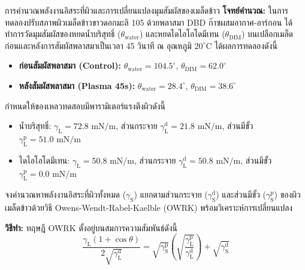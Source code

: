 \begin{examplebox}{การคำนวณพลังงานอิสระที่ผิวและการเปลี่ยนแปลงมุมสัมผัสของเมล็ดข้าว}
\textbf{โจทย์คำนวณ:} ในการทดลองปรับสภาพผิวเมล็ดข้าวขาวดอกมะลิ 105 ด้วยพลาสมา DBD ก๊าซผสมอากาศ-อาร์กอน ได้ทำการวัดมุมสัมผัสของหยดน้ำบริสุทธิ์ ($\theta_{\text{water}}$) และหยดไดไอโอโดมีเทน ($\theta_{\text{DIM}}$) บนเปลือกเมล็ดก่อนและหลังการสัมผัสพลาสมาเป็นเวลา 45 วินาที ณ อุณหภูมิ $20^\circ\text{C}$ ได้ผลการทดลองดังนี้
\begin{itemize}
    \item \textbf{ก่อนสัมผัสพลาสมา (Control):} $\theta_{\text{water}} = 104.5^\circ$, $\theta_{\text{DIM}} = 62.0^\circ$
    \item \textbf{หลังสัมผัสพลาสมา (Plasma 45s):} $\theta_{\text{water}} = 28.4^\circ$, $\theta_{\text{DIM}} = 38.6^\circ$
\end{itemize}
กำหนดให้ของเหลวทดสอบมีพารามิเตอร์แรงตึงผิวดังนี้
\begin{itemize}
    \item น้ำบริสุทธิ์: $\gamma_{\text{L}} = 72.8 \text{ mN/m}$, ส่วนกระจาย $\gamma_{\text{L}}^{\text{d}} = 21.8 \text{ mN/m}$, ส่วนมีขั้ว $\gamma_{\text{L}}^{\text{p}} = 51.0 \text{ mN/m}$
    \item ไดไอโอโดมีเทน: $\gamma_{\text{L}} = 50.8 \text{ mN/m}$, ส่วนกระจาย $\gamma_{\text{L}}^{\text{d}} = 50.8 \text{ mN/m}$, ส่วนมีขั้ว $\gamma_{\text{L}}^{\text{p}} = 0.0 \text{ mN/m}$
\end{itemize}
จงคำนวณหาพลังงานอิสระที่ผิวทั้งหมด ($\gamma_{\text{S}}$) แยกตามส่วนกระจาย ($\gamma_{\text{S}}^{\text{d}}$) และส่วนมีขั้ว ($\gamma_{\text{S}}^{\text{p}}$) ของผิวเมล็ดข้าวด้วยวิธี Owens-Wendt-Rabel-Kaelble (OWRK) พร้อมวิเคราะห์การเปลี่ยนแปลง

\vspace{6pt}
\textbf{วิธีทำ:}
ทฤษฎี OWRK ตั้งอยู่บนสมการความสัมพันธ์ดังนี้
\begin{equation*}
    \frac{\gamma_{\text{L}} (1 + \cos \theta)}{2 \sqrt{\gamma_{\text{L}}^{\text{d}}}} = \sqrt{\gamma_{\text{S}}^{\text{p}}} \left( \sqrt{\frac{\gamma_{\text{L}}^{\text{p}}}{\gamma_{\text{L}}^{\text{d}}}} \right) + \sqrt{\gamma_{\text{S}}^{\text{d}}}
\end{equation*}


\end{examplebox}
